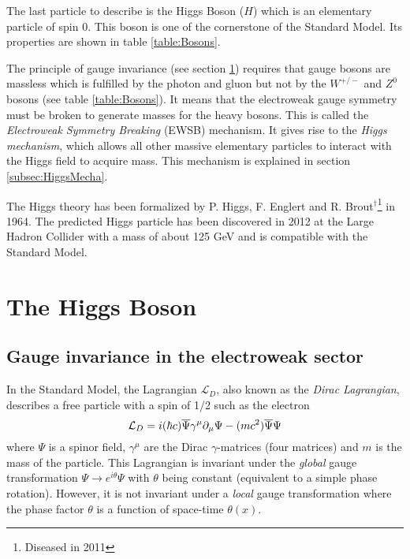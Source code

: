 The last particle to describe is the Higgs Boson ($H$) which is an elementary particle of spin 0. This boson is one of the cornerstone of the Standard Model. Its properties are shown in table \ref{table:Bosons}.

The principle of gauge invariance (see section \ref{sec:HiggsTheo}) requires that gauge bosons are massless which is fulfilled by the photon and gluon but not by the $W^{+/-}$ and $Z^0$ bosons (see table \ref{table:Bosons}). It means that the electroweak gauge symmetry must be broken to generate masses for the heavy bosons. This is called the \textit{Electroweak Symmetry Breaking} (EWSB) mechanism. It gives rise to the \textit{Higgs mechanism}, which allows all other massive elementary particles to interact with the Higgs field to acquire mass. This mechanism is explained in section \ref{subsec:HiggsMecha}.

The Higgs theory \cite{Higgs:1964pj, Englert:1964et} has been formalized by P. Higgs, F. Englert and R. Brout$^\dagger$\footnote{Diseased in 2011} in 1964. The predicted Higgs particle has been discovered in 2012 at the Large Hadron Collider \cite{Aad:2012tfa, Chatrchyan:2012xdj} with a mass of about 125 GeV and is compatible with the Standard Model.

\section{The Higgs Boson}
\label{sec:HiggsTheo}

\subsection{Gauge invariance in the electroweak sector}

In the Standard Model, the Lagrangian $\mathcal{L}_{D}$, also known as the \textit{Dirac Lagrangian}, describes a free particle with a spin of 1/2 such as the electron \cite{Griffiths:343277}
\begin{equation}
  \mathcal{L}_{D} = i(\hbar c)\overline{\rm \Psi}\gamma^{\mu}\partial_{\mu}\Psi - (mc^2)\overline{\rm \Psi}\Psi
\end{equation}
where $\Psi$ is a spinor field, $\gamma^{\mu}$ are the Dirac $\gamma$-matrices (four matrices) \cite{Peskin:1995ev} and $m$ is the mass of the particle. This Lagrangian is invariant under the \textit{global} gauge transformation $\Psi \rightarrow e^{i\theta}\Psi$ with $\theta$ being constant (equivalent to a simple phase rotation). However, it is not invariant under a \textit{local} gauge transformation where the phase factor $\theta$ is a function of space-time $\theta(x)$.

